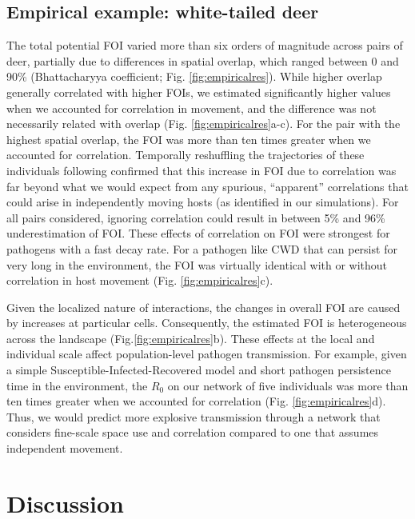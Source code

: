 ﻿\documentclass[11pt]{article}
\begin{document}
\subsection*{Empirical example: white-tailed deer}

The total potential FOI varied more than six orders of magnitude across pairs of deer, partially due to differences in spatial overlap, which ranged between 0 and 90\% (Bhattacharyya coefficient; Fig. \ref{fig:empiricalres}). While higher overlap generally correlated with higher FOIs, we estimated significantly higher values when we accounted for correlation in movement, and the difference was not necessarily related with overlap (Fig. \ref{fig:empiricalres}a-c).  For the pair with the highest spatial overlap, the FOI was more than ten times greater when we accounted for correlation. Temporally reshuffling the trajectories of these individuals following \citet{Spiegel2016} confirmed that this increase in FOI due to correlation was far beyond what we would expect from any  spurious, ``apparent'' correlations that could arise in independently moving hosts (as identified in our simulations). For all pairs considered, ignoring correlation could result in between 5\% and 96\% underestimation of FOI. These effects of correlation on FOI were strongest for pathogens with a fast decay rate. For a pathogen like CWD that can persist for very long in the environment, the FOI was virtually identical with or without correlation in host movement (Fig. \ref{fig:empiricalres}c). 

Given the localized nature of interactions, the changes in overall FOI are caused by increases at particular cells. Consequently, the estimated FOI is heterogeneous across the landscape (Fig.\ref{fig:empiricalres}b). These effects at the local and individual scale affect population-level pathogen transmission. For example, given a simple Susceptible-Infected-Recovered model and short pathogen persistence time in the environment, the $R_0$ on our network of five individuals was more than ten times greater when we accounted for correlation (Fig. \ref{fig:empiricalres}d). Thus, we would predict more explosive transmission through a network that considers fine-scale space use and correlation compared to one that assumes independent movement.

\section*{Discussion}
\end{document}
